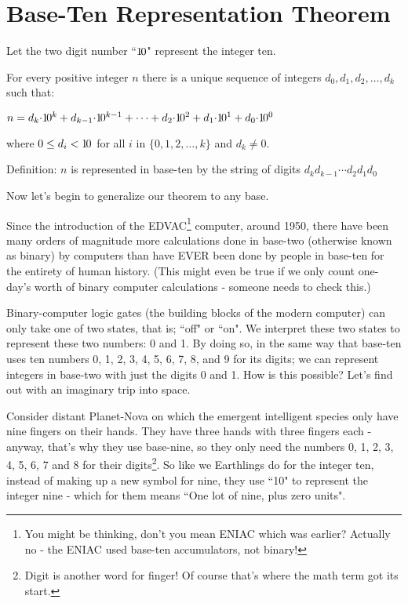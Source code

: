 \documentclass{article}
\newenvironment{jprIn}{\begin{adjustwidth}{2em}{}}{\end{adjustwidth}}
\begin{document}
\section*{Base-Ten Representation Theorem}
\begin{jprIn}
Let the two digit number ``${1\hspace{-0.12em}0}$" represent the integer ten.

For every positive integer $n$ there is a unique
sequence of integers $d_0, d_1, d_2,\dots{},d_k$ such that:

\hspace{3em}$n
=d_k{\cdot}{1\hspace{-0.12em}0}^k
+d_{k-1}{\cdot}{1\hspace{-0.12em}0}^{k-1}
+\dots
+d_2{\cdot}{1\hspace{-0.12em}0}^2
+d_1{\cdot}{1\hspace{-0.12em}0}^1
+d_0{\cdot}{1\hspace{-0.12em}0}^0$

where $0\le{}d_i<{1\hspace{-0.12em}0}$ for all $i$ in $\{0,1,2,\dots{},k\}$ and $d_k\ne0$.

Definition: $n$ is represented in base-ten by the string of digits $d_kd_{k-1}{\cdots}d_2d_1d_0$
\end{jprIn}
\bigskip

\break
Now let's begin to generalize our theorem to any base.

Since the introduction of the EDVAC\footnote{You might be thinking, don't you
mean ENIAC which was earlier? Actually no - the ENIAC
used base-ten accumulators, not binary!} computer, around 1950,
there have been many orders of magnitude more calculations done
in base-two (otherwise known as binary) by computers than have EVER
been done by people in base-ten for the entirety of human history.
(This might even be true if we only count one-day's worth of
binary computer calculations - someone needs to check this.)

Binary-computer logic gates (the building blocks of the modern computer)
can only take one of two states, that is; ``off" or ``on".
We interpret these two states to represent these two numbers: 0 and 1.
By doing so, in the same way that base-ten uses ten numbers 0,
1, 2, 3, 4, 5, 6, 7, 8, and 9 for its digits; we can represent integers
in base-two with just the digits 0 and 1. How is this possible?
Let's find out with an imaginary trip into space.

Consider distant Planet-Nova on which the emergent
intelligent species only have nine fingers on their hands.
They have three hands with three fingers each - anyway,
that's why they use base-nine, so they only need the numbers 0,
1, 2, 3, 4, 5, 6, 7 and 8 for their digits\footnote{Digit
is another word for finger! Of course that's where the math term got its start.}.
So like we Earthlings do for the integer ten,
instead of making up a new symbol for nine,
they use ``10" to represent the integer nine - which
for them means ``One lot of nine, plus zero units".
\end{document}
